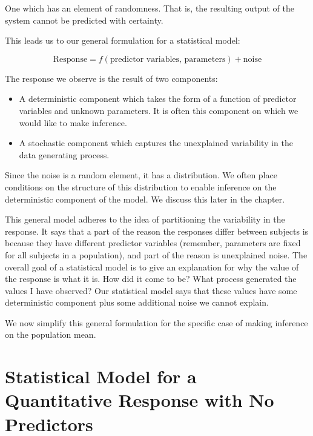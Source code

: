 \documentclass[]{book}
\providecommand{\tightlist}{%
  \setlength{\itemsep}{0pt}\setlength{\parskip}{0pt}}
\theoremstyle{plain}
\theoremstyle{mydefn}
\theoremstyle{myexmpl}
\theoremstyle{remark}
\let\BeginKnitrBlock\begin \let\EndKnitrBlock\end
\let\BeginKnitrBlock\begin \let\EndKnitrBlock\end
\begin{document}
\BeginKnitrBlock{definition}[Stochastic Process]
\protect\hypertarget{def:defn-stochastic-process}{}{\label{def:defn-stochastic-process}
{} }One which has an element of
randomness. That is, the resulting output of the system cannot be
predicted with certainty.
\EndKnitrBlock{definition}

This leads us to our general formulation for a statistical model:

\begin{equation}
  \text{Response} = f(\text{predictor variables, parameters}) + \text{noise}
  \label{eq:general-model}
\end{equation}

The response we observe is the result of two components:

\begin{itemize}
\tightlist
\item
  A deterministic component which takes the form of a function of
  predictor variables and unknown parameters. It is often this component
  on which we would like to make inference.
\item
  A stochastic component which captures the unexplained variability in
  the data generating process.
\end{itemize}

Since the noise is a random element, it has a distribution. We often
place conditions on the structure of this distribution to enable
inference on the deterministic component of the model. We discuss this
later in the chapter.

This general model adheres to the idea of partitioning the variability
in the response. It says that a part of the reason the responses differ
between subjects is because they have different predictor variables
(remember, parameters are fixed for all subjects in a population), and
part of the reason is unexplained noise. The overall goal of a
statistical model is to give an explanation for why the value of the
response is what it is. How did it come to be? What process generated
the values I have observed? Our statistical model says that these values
have some deterministic component plus some additional noise we cannot
explain.

We now simplify this general formulation for the specific case of making
inference on the population mean.

\section{Statistical Model for a Quantitative Response with No
Predictors}\label{statistical-model-for-a-quantitative-response-with-no-predictors}
\end{document}
